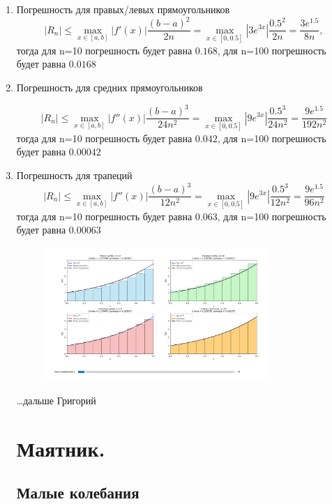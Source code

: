 \documentclass{report}
\begin{document}
\begin{enumerate}
\item
\noindent Погрешность для правых/левых прямоугольников
\[
    |R_n| \le \max_{x\in[a, b]}|f'(x)|\dfrac{(b-a)^2}{2n} = \max_{x\in[0, 0.5]}|3e^{3x}|\dfrac{0.5^2}{2n} = \dfrac{3e^{1.5}}{8n},
\]
тогда для n=10 погрешность будет равна $0.168$, для n=100 погрешность будет равна $0.0168$
\item 
\noindent Погрешность для средних прямоугольников

\[
|R_n| \le \max_{x\in [a, b]}|f''(x)|\dfrac{(b-a)^3}{24n^2} = \max_{x\in[0, 0.5]}|9e^{3x}|\dfrac{0.5^3}{24n^2} = \dfrac{9e^{1.5}}{192n^2}
\]
тогда для n=10 погрешность будет равна $0.042$, для n=100 погрешность будет равна $0.00042$
\item 
\noindent Погрешность для трапеций
\[
|R_n| \le \max_{x\in [a, b]}|f''(x)|\dfrac{(b-a)^3}{12n^2} = \max_{x\in[0, 0.5]}|9e^{3x}|\dfrac{0.5^3}{12n^2} = \dfrac{9e^{1.5}}{96n^2}
\]
тогда для n=10 погрешность будет равна $0.063$, для n=100 погрешность будет равна $0.00063$
\begin{figure}[H]
    \begin{center}
    \includegraphics[width=0.8\textwidth]{mis_1.png}
\end{center}
\end{figure}


\dots дальше Григорий

\section{\textbf{ Маятник.}}

\subsection{Малые колебания}


\end{enumerate}
\end{document}
